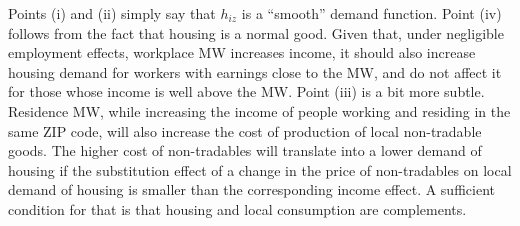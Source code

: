 Points (i) and (ii) simply say that $h_{iz}$ is a ``smooth'' demand function.
Point (iv) follows from the fact that housing is a normal good.
Given that, under negligible employment effects, workplace MW increases income, 
it should also increase housing demand for workers with earnings close to the MW, 
and do not affect it for those whose income is well above the MW.
Point (iii) is a bit more subtle.
Residence MW, while increasing the income of people working and residing in the 
same ZIP code, will also increase the cost of production of local non-tradable 
goods.
The higher cost of non-tradables will translate into a lower demand of housing 
if the substitution effect of a change in the price of non-tradables on local demand 
of housing is smaller than the corresponding income effect.
A sufficient condition for that is that housing and local consumption are complements.%

